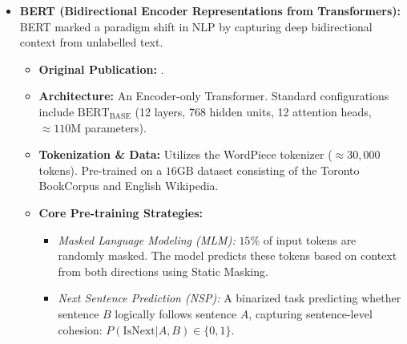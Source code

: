 \begin{itemize}
	\item \textbf{BERT (Bidirectional Encoder Representations from Transformers):} BERT marked a paradigm shift in NLP by capturing deep bidirectional context from unlabelled text.
	\begin{itemize}
		\item \textbf{Original Publication:} \cite{devlin2019bert}.
		\item \textbf{Architecture:} An Encoder-only Transformer. Standard configurations include $\text{BERT}_{\text{BASE}}$ (12 layers, 768 hidden units, 12 attention heads, $\approx 110\text{M}$ parameters).
		\item \textbf{Tokenization \& Data:} Utilizes the WordPiece tokenizer ($\approx 30,000$ tokens). Pre-trained on a $16\text{GB}$ dataset consisting of the Toronto BookCorpus and English Wikipedia.
		\item \textbf{Core Pre-training Strategies:} 
		\begin{itemize}
			\item \textit{Masked Language Modeling (MLM):} $15\%$ of input tokens are randomly masked. The model predicts these tokens based on context from both directions using Static Masking.
			\item \textit{Next Sentence Prediction (NSP):} A binarized task predicting whether sentence $B$ logically follows sentence $A$, capturing sentence-level cohesion: $P(\text{IsNext} | A, B) \in \{0, 1\}$.
		\end{itemize}
	\end{itemize}
	

\end{itemize}
